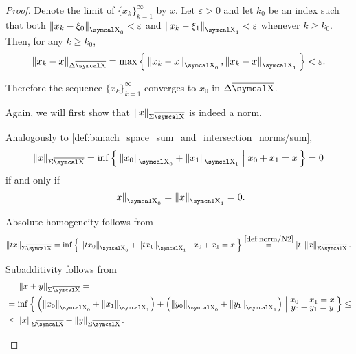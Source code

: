 \begin{proof}
  Denote the limit of \( \{ x_k \}_{k=1}^\infty \) by \( x \). Let \( \varepsilon > 0 \) and let \( k_0 \) be an index such that both \( \Norm{x_k - \xi_0}_{\CX_0} < \varepsilon \) and \( \Norm{x_k - \xi_1}_{\CX_1} < \varepsilon \) whenever \( k \geq k_0 \). Then, for any \( k \geq k_0 \),
  \begin{equation*}
    \Norm{x_k - x}_{\Delta \Ol{\CX}}
    =
    \max\Set{\Norm{x_k - x}_{\CX_0}, \Norm{x_k - x}_{\CX_1}}
    <
    \varepsilon.
  \end{equation*}

  Therefore the sequence \( \{ x_k \}_{k=1}^\infty \) converges to \( x_0 \) in \( \Delta \Ol{\CX} \).

   Again, we will first show that \( \Norm{x}_{\Sigma \Ol{\CX}} \) is indeed a norm.
  \begin{RefList}
     Analogously to \ref{def:banach_space_sum_and_intersection_norms/sum},
    \begin{equation*}
      \Norm{x}_{\Sigma \Ol{\CX}} = \inf \Set{ \Norm{x_0}_{\CX_0} + \Norm{x_1}_{\CX_1} | x_0 + x_1 = x } = 0
    \end{equation*}
    if and only if
    \begin{equation*}
      \Norm{x}_{\CX_0} = \Norm{x}_{\CX_1} = 0.
    \end{equation*}

     Absolute homogeneity follows from
    \begin{equation*}
      \Norm{tx}_{\Sigma \Ol{\CX}}
      =
      \inf \Set{ \Norm{tx_0}_{\CX_0} + \Norm{tx_1}_{\CX_1} | x_0 + x_1 = x }
      \overset {\ref{def:norm/N2}} =
      \Abs{t} \Norm{x}_{\Sigma \Ol{\CX}}.
    \end{equation*}

     Subadditivity follows from
    \begin{align*}
      &\phantom{{}={}}
      \Norm{x + y}_{\Sigma \Ol{\CX}}
      = \\ &=
      \inf \Set{ \left( \Norm{x_0}_{\CX_0} + \Norm{x_1}_{\CX_1} \right) + \left( \Norm{y_0}_{\CX_0} + \Norm{y_1}_{\CX_1} \right) | \substack{\textstyle{x_0 + x_1 = x} \\ \textstyle{y_0 + y_1 = y}} }
      \leq \\ &\leq
      \Norm{x}_{\Sigma \Ol{\CX}} + \Norm{y}_{\Sigma \Ol{\CX}}.
    \end{align*}
  \end{RefList}


\end{proof}
